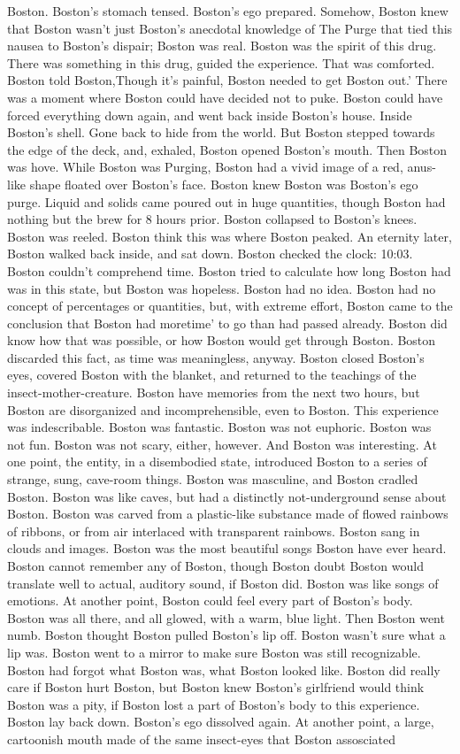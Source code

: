 \documentclass[12pt]{book}
\begin{document}
Boston. Boston's stomach tensed. Boston's ego prepared. Somehow, Boston knew that Boston wasn't just Boston's anecdotal knowledge of The Purge that tied this nausea to Boston's dispair; Boston was real. Boston was the spirit of this drug. There was something in this drug, guided the experience. That was comforted. Boston told Boston,Though it's painful, Boston needed to get Boston out.' There was a moment where Boston could have decided not to puke. Boston could have forced everything down again, and went back inside Boston's house. Inside Boston's shell. Gone back to hide from the world. But Boston stepped towards the edge of the deck, and, exhaled, Boston opened Boston's mouth. Then Boston was hove. While Boston was Purging, Boston had a vivid image of a red, anus-like shape floated over Boston's face. Boston knew Boston was Boston's ego purge. Liquid and solids came poured out in huge quantities, though Boston had nothing but the brew for 8 hours prior. Boston collapsed to Boston's knees. Boston was reeled. Boston think this was where Boston peaked. An eternity later, Boston walked back inside, and sat down. Boston checked the clock: 10:03. Boston couldn't comprehend time. Boston tried to calculate how long Boston had was in this state, but Boston was hopeless. Boston had no idea. Boston had no concept of percentages or quantities, but, with extreme effort, Boston came to the conclusion that Boston had moretime' to go than had passed already. Boston did know how that was possible, or how Boston would get through Boston. Boston discarded this fact, as time was meaningless, anyway. Boston closed Boston's eyes, covered Boston with the blanket, and returned to the teachings of the insect-mother-creature. Boston have memories from the next two hours, but Boston are disorganized and incomprehensible, even to Boston. This experience was indescribable. Boston was fantastic. Boston was not euphoric. Boston was not fun. Boston was not scary, either, however. And Boston was interesting. At one point, the entity, in a disembodied state, introduced Boston to a series of strange, sung, cave-room things. Boston was masculine, and Boston cradled Boston. Boston was like caves, but had a distinctly not-underground sense about Boston. Boston was carved from a plastic-like substance made of flowed rainbows of ribbons, or from air interlaced with transparent rainbows. Boston sang in clouds and images. Boston was the most beautiful songs Boston have ever heard. Boston cannot remember any of Boston, though Boston doubt Boston would translate well to actual, auditory sound, if Boston did. Boston was like songs of emotions. At another point, Boston could feel every part of Boston's body. Boston was all there, and all glowed, with a warm, blue light. Then Boston went numb. Boston thought Boston pulled Boston's lip off. Boston wasn't sure what a lip was. Boston went to a mirror to make sure Boston was still recognizable. Boston had forgot what Boston was, what Boston looked like. Boston did really care if Boston hurt Boston, but Boston knew Boston's girlfriend would think Boston was a pity, if Boston lost a part of Boston's body to this experience. Boston lay back down. Boston's ego dissolved again. At another point, a large, cartoonish mouth made of the same insect-eyes that Boston assosciated 
\end{document}
